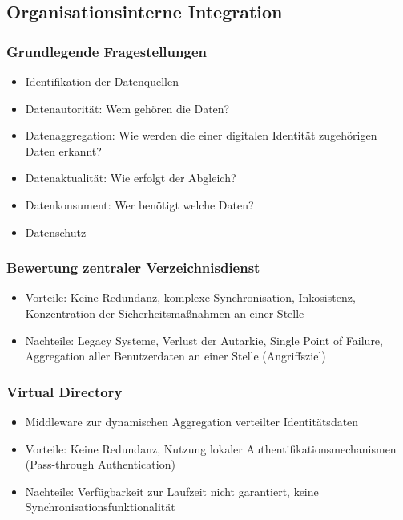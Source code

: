 \subsection{Organisationsinterne Integration}

\subsubsection{Grundlegende Fragestellungen}
\begin{itemize}
	\item Identifikation der Datenquellen
	\item Datenautorität: Wem gehören die Daten?
	\item Datenaggregation: Wie werden die einer digitalen Identität zugehörigen Daten erkannt?
	\item Datenaktualität: Wie erfolgt der Abgleich?
	\item Datenkonsument: Wer benötigt welche Daten?
	\item Datenschutz
\end{itemize}

\subsubsection{Bewertung zentraler Verzeichnisdienst}
\begin{itemize}
	\item Vorteile: Keine {Redundanz, komplexe Synchronisation, Inkosistenz}, Konzentration der Sicherheitsmaßnahmen an einer Stelle
	\item Nachteile: Legacy Systeme, Verlust der Autarkie, Single Point of Failure, Aggregation aller Benutzerdaten an einer Stelle (Angriffsziel)
\end{itemize}

\subsubsection{Virtual Directory}
\begin{itemize}
	\item Middleware zur dynamischen Aggregation verteilter Identitätsdaten
	\item Vorteile: Keine Redundanz, Nutzung lokaler Authentifikationsmechanismen (Pass-through Authentication)
	\item Nachteile: Verfügbarkeit zur Laufzeit nicht garantiert, keine Synchronisationsfunktionalität
\end{itemize}

